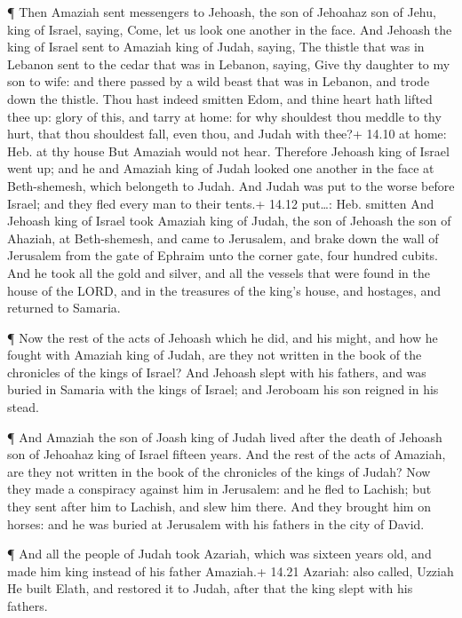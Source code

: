  ¶ Then Amaziah sent messengers to Jehoash, the son of
Jehoahaz son of Jehu, king of Israel, saying, Come, let us look one
another in the face.  And Jehoash the king of Israel sent to
Amaziah king of Judah, saying, The thistle that was in Lebanon sent to
the cedar that was in Lebanon, saying, Give thy daughter to my son to
wife: and there passed by a wild beast that was in Lebanon, and trode
down the thistle.  Thou hast indeed smitten Edom, and thine
heart hath lifted thee up: glory of this, and tarry at home: for why
shouldest thou meddle to thy hurt, that thou shouldest fall, even thou,
and Judah with thee?+ 14.10 at home: Heb. at thy house  But
Amaziah would not hear. Therefore Jehoash king of Israel went up; and he
and Amaziah king of Judah looked one another in the face at
Beth-shemesh, which belongeth to Judah.  And Judah was put
to the worse before Israel; and they fled every man to their tents.+
14.12 put\ldots: Heb. smitten  And Jehoash king of Israel
took Amaziah king of Judah, the son of Jehoash the son of Ahaziah, at
Beth-shemesh, and came to Jerusalem, and brake down the wall of
Jerusalem from the gate of Ephraim unto the corner gate, four hundred
cubits.  And he took all the gold and silver, and all the
vessels that were found in the house of the LORD, and in the treasures
of the king's house, and hostages, and returned to Samaria.

 ¶ Now the rest of the acts of Jehoash which he did, and
his might, and how he fought with Amaziah king of Judah, are they not
written in the book of the chronicles of the kings of Israel?
 And Jehoash slept with his fathers, and was buried in
Samaria with the kings of Israel; and Jeroboam his son reigned in his
stead.

 ¶ And Amaziah the son of Joash king of Judah lived after
the death of Jehoash son of Jehoahaz king of Israel fifteen years.
 And the rest of the acts of Amaziah, are they not written
in the book of the chronicles of the kings of Judah?  Now
they made a conspiracy against him in Jerusalem: and he fled to Lachish;
but they sent after him to Lachish, and slew him there. 
And they brought him on horses: and he was buried at Jerusalem with his
fathers in the city of David.

 ¶ And all the people of Judah took Azariah, which was
sixteen years old, and made him king instead of his father Amaziah.+
14.21 Azariah: also called, Uzziah  He built Elath, and
restored it to Judah, after that the king slept with his fathers.

